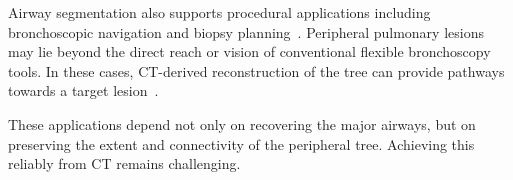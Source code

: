 Airway segmentation also supports procedural applications including bronchoscopic navigation and biopsy
planning~\cite{Dhillon2017PeripheralBronchoscopy,HammadAltaq2023robotic}. Peripheral pulmonary lesions may lie beyond
the direct reach or vision of conventional flexible bronchoscopy tools. In these cases, CT-derived reconstruction of
the tree can provide pathways towards a target lesion~\cite{HammadAltaq2023robotic}.

These applications depend not only on recovering the major airways, but on preserving the extent and connectivity
of the peripheral tree. Achieving this reliably from CT remains challenging.


